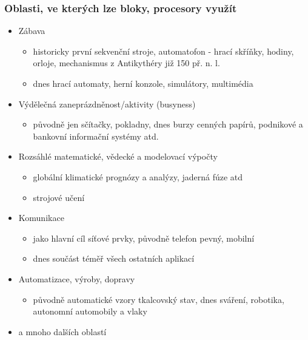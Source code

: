 \documentclass{beamer}
\begin{document}
\begin{frame}
\frametitle{Oblasti, ve kterých lze bloky, procesory využít}

\begin{itemize}
 \item Zábava
 \begin{itemize}
  \item historicky první sekvenční stroje, automatofon - hrací skříňky, hodiny, orloje, mechanismus z Antikythéry již 150 př. n. l.
  \item dnes hrací automaty, herní konzole, simulátory, multimédia
 \end{itemize}
 \item Výdělečná zaneprázdněnost/aktivity (busyness)
 \begin{itemize}
  \item původně jen sčítačky, pokladny, dnes burzy cenných papírů, podnikové a bankovní informační systémy atd.
 \end{itemize}
 \item Rozsáhlé matematické, vědecké a modelovací výpočty
 \begin{itemize}
  \item globální klimatické prognózy a analýzy, jaderná fúze atd
  \item strojové učení
 \end{itemize}
 \item Komunikace
 \begin{itemize}
  \item jako hlavní cíl síťové prvky, původně telefon pevný, mobilní
  \item dnes součást téměř všech ostatních aplikací
 \end{itemize}
 \item Automatizace, výroby, dopravy
 \begin{itemize}
  \item původně automatické vzory tkalcovský stav, dnes sváření, robotika, autonomní automobily a vlaky
 \end{itemize}
 \item a mnoho dalších oblastí
\end{itemize}
\end{frame}
\end{document}
